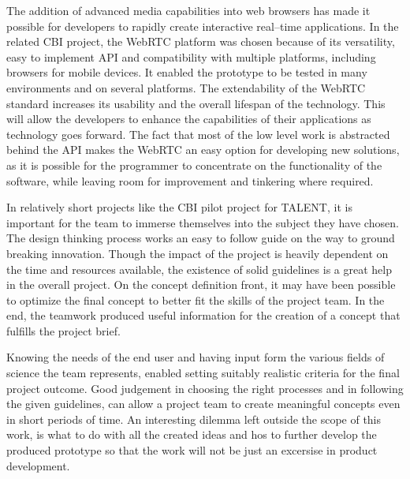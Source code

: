 \documentclass[english,12pt,a4paper,pdftex]{article}
\begin{document}
The addition of advanced media capabilities into web browsers has made it possible for developers to rapidly create interactive real--time applications. In the related CBI project, the WebRTC platform was chosen because of its versatility, easy to implement API and compatibility with multiple platforms, including browsers for mobile devices. It enabled the prototype to be tested in many environments and on several platforms. The extendability of the WebRTC standard increases its usability and the overall lifespan of the technology. This will allow the developers to enhance the capabilities of their applications as technology goes forward. The fact that most of the low level work is abstracted behind the API makes the WebRTC an easy option for developing new solutions, as it is possible for the programmer to concentrate on the functionality of the software, while leaving room for improvement and tinkering where required.

In relatively short projects like the CBI pilot project for TALENT, it is important for the team to immerse themselves into the subject they have chosen. The design thinking process works an easy to follow guide on the way to ground breaking innovation. Though the impact of the project is heavily dependent on the time and resources available, the existence of solid guidelines is a great help in the overall project. On the concept definition front, it may have been possible to optimize the final concept to better fit the skills of the project team. In the end, the teamwork produced useful information for the creation of a concept that fulfills the project brief.

Knowing the needs of the end user and having input form the various fields of science the team represents, enabled setting suitably realistic criteria for the final project outcome. Good judgement in choosing the right processes and in following the given guidelines, can allow a project team to create meaningful concepts even in short periods of time. An interesting dilemma left outside the scope of this work, is what to do with all the created ideas and hos to further develop the produced prototype so that the work will not be just an excersise in product development.

\clearpage


\end{document}
